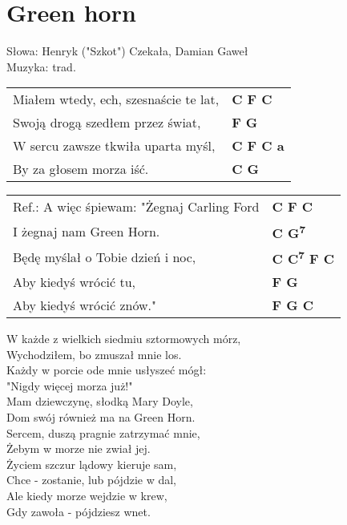 \section{Green horn}

Słowa: Henryk ("Szkot") Czekała, Damian Gaweł \\
Muzyka:  trad.

\vspace{2em}
\begin{tabular}{@{}p{9cm}@{}l@{}}
Miałem wtedy, ech, szesnaście te lat, & \bfseries  C F C \\
Swoją drogą szedłem przez świat, & \bfseries  F G \\
W sercu zawsze tkwiła uparta myśl, & \bfseries  C F C a \\
By za głosem morza iść. & \bfseries  C G \\
\end{tabular}

\vspace{1em}
\begin{tabular}{@{}p{9cm}@{}l@{}}
Ref.: A więc śpiewam: "Żegnaj Carling Ford & \bfseries  C F C \\
I żegnaj nam Green Horn. & \bfseries  C G\textsuperscript{7} \\
Będę myślał o Tobie dzień i noc, & \bfseries  C C\textsuperscript{7} F C \\
Aby kiedyś wrócić tu, & \bfseries  F G \\
Aby kiedyś wrócić znów." & \bfseries  F G C \\
\end{tabular}

\vspace{1em}
W każde z wielkich siedmiu sztormowych mórz, \\
Wychodziłem, bo zmuszał mnie los. \\
Każdy w porcie ode mnie usłyszeć mógł: \\
"Nigdy więcej morza już!" \\

Mam dziewczynę, słodką Mary Doyle, \\
Dom swój również ma na Green Horn. \\
Sercem, duszą pragnie zatrzymać mnie, \\
Żebym w morze nie zwiał jej. \\

Życiem szczur lądowy kieruje sam, \\
Chce - zostanie, lub pójdzie w dal, \\
Ale kiedy morze wejdzie w krew, \\
Gdy zawoła - pójdziesz wnet. \\
